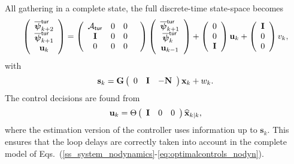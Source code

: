 \documentclass[a4paper,12pt]{article}
\newcommand{\0}{\mathsf{0}} %
\newcommand{\I}{\mathbf{I}} %
\newcommand{\N}{\mathbf{N}} %
\newcommand{\D}{\mathbf{G}} %
\newcommand{\tur}{\mathsf{\tiny{tur}}}
\newcommand{\phivec}{{\boldsymbol{\psi}}}
\newcommand{\svec}{{\mathbf{s}}}
\newcommand{\xvec}{{\mathbf{x}}}
\newcommand{\uvec}{{\mathbf{u}}}
\begin{document}
          All gathering in a complete state, the full
          discrete-time state-space becomes 
          \begin{equation}\label{ss_system_nodynamics}
            \left(
              \begin{array}
                [c]{c}%
                \overline\phivec_{k+2}^{\tur} \\ \overline\phivec_{k+1}^{\tur} \\ \uvec_{k}
              \end{array}	
            \right)
            = 
            \left(
              \begin{array}
                [c]{ccccc}%
                \mathcal{A}_{\tur} & 0 & 0 &\\
            \I & 0 & 0 \\
            0 & 0 & 0 \\
          \end{array}	
        \right)
        \left(
          \begin{array}
            [c]{c}%
            \overline\phivec_{k+1}^{\tur} \\ \overline\phivec_{k}^{\tur} \\ \uvec_{k-1}
          \end{array}	
        \right) 
        +
        \left(
          \begin{array}
            [c]{c}%
            0 \\ 0 \\ \I 
          \end{array}	
        \right)
        \uvec_k
        +
        \left(
          \begin{array}
            [c]{c}%
            \I \\ 0 \\ 0 
          \end{array}	
        \right)
        v_k ,
      \end{equation} 
      with 
      \begin{equation}\label{eq:pseudomeasurement_nodyn}
        \svec_k = \D
        \left(
          \begin{array}
            [c]{ccccc}%
             0 & \I &  -\N
          \end{array}	
        \right) 
        \xvec_k + w_k .
      \end{equation}
      The control decisions are found from 
      \begin{equation}\label{eq:optimalcontrols_nodyn}
        \uvec_k = \Theta
        \left(
          \begin{array}
            [c]{ccccc}%
            \I  & 0 & 0
          \end{array}	
        \right) 
        \widehat{\xvec}_{k|k} ,
      \end{equation}
      where the estimation version of the controller uses information
      up to $\svec_{k}$. This ensures that the loop delays are correctly taken
      into account in the complete model of Eqs.~(\ref{ss_system_nodynamics}-\ref{eq:optimalcontrols_nodyn}).
      
\end{document}
